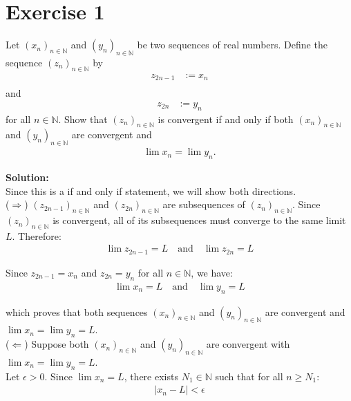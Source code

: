 \documentclass{article}
\begin{document}
\section*{Exercise 1}
Let $(x_n)_{n \in \mathbb{N}}$ and $(y_n)_{n \in \mathbb{N}}$ be two sequences of real numbers. Define the sequence $(z_n)_{n \in \mathbb{N}}$ by
\begin{align*}
z_{2n-1} &:= x_n\\
\end{align*}
and
\begin{align*}
z_{2n} &:= y_n
\end{align*}
for all $n \in \mathbb{N}$. Show that $(z_n)_{n \in \mathbb{N}}$ is convergent if and only if both $(x_n)_{n \in \mathbb{N}}$ and $(y_n)_{n \in \mathbb{N}}$ are convergent and
\begin{align*}
\lim x_n = \lim y_n.
\end{align*}

\textbf{Solution: }\\

Since this is a if and only if statement, we will show both directions. \\

($\Rightarrow$) $(z_{2n-1})_{n \in \mathbb{N}}$ and $(z_{2n})_{n \in \mathbb{N}}$ are subsequences of $(z_n)_{n \in \mathbb{N}}$. Since $(z_n)_{n \in \mathbb{N}}$ is convergent, all of its subsequences must converge to the same limit $L$. Therefore:
\begin{align*}
\lim z_{2n-1} = L \quad \text{and} \quad \lim z_{2n} = L
\end{align*}

Since $z_{2n-1} = x_n$ and $z_{2n} = y_n$ for all $n \in \mathbb{N}$, we have:
\begin{align*}
\lim x_n = L \quad \text{and} \quad \lim y_n = L
\end{align*}

which proves that both sequences $(x_n)_{n \in \mathbb{N}}$ and $(y_n)_{n \in \mathbb{N}}$ are convergent and $\lim x_n = \lim y_n = L$. \\

($\Leftarrow$) Suppose both $(x_n)_{n \in \mathbb{N}}$ and $(y_n)_{n \in \mathbb{N}}$ are convergent with $\lim x_n = \lim y_n = L$. \\

Let $\epsilon > 0$. Since $\lim x_n = L$, there exists $N_1 \in \mathbb{N}$ such that for all $n \geq N_1$:
\begin{align*}
|x_n - L| < \epsilon
\end{align*}
\end{document}
